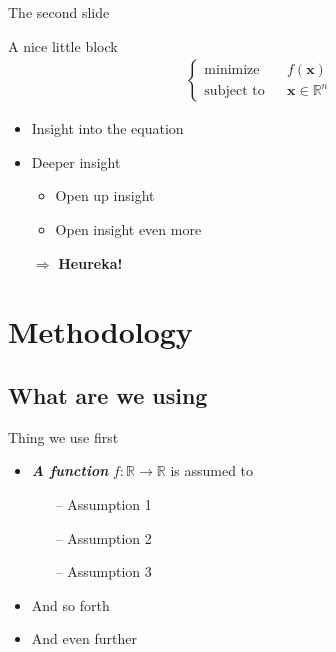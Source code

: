 \documentclass{beamer}
\theoremstyle{plain}
\theoremstyle{definition}
\theoremstyle{definition}
\newcommand{\x}{{\boldsymbol x}}           %
\newcommand{\R}{\mathbb{R}}
\begin{document}
\begin{frame}{The second slide}
\begin{small}


\begin{block}{A nice little block}\vspace{-0.3cm}
	\begin{align*}
		\begin{cases}
		\text{minimize}\quad\, & f(\x) \\
		\text{subject to} & \x \in \R^n
		\end{cases}
	\end{align*}
\end{block}

\begin{itemize}

\item Insight into the equation

\item Deeper insight
\begin{itemize}
  \item Open up insight
  \item Open insight even more
\end{itemize} \vspace{0.3cm}

\item[$\Rightarrow$] {\bf \color{palatinatepurple!80!black} Heureka!}

\end{itemize}

\end{small}
\end{frame}

\section{Methodology}
\subsection{What are we using}

\begin{frame}{Thing we use first}	
\begin{small}


\begin{itemize}
\item {\bf \em \color{palatinatepurple!80!black} A function} $f:\R \rightarrow\R$ is assumed to
	\begin{itemize}
	  \item[--] Assumption 1
	  \item[--] Assumption 2
	  \item[--] Assumption 3
	\end{itemize}	
\item And so forth
\item And even further
\end{itemize}

\end{small}
\end{frame}
\end{document}
